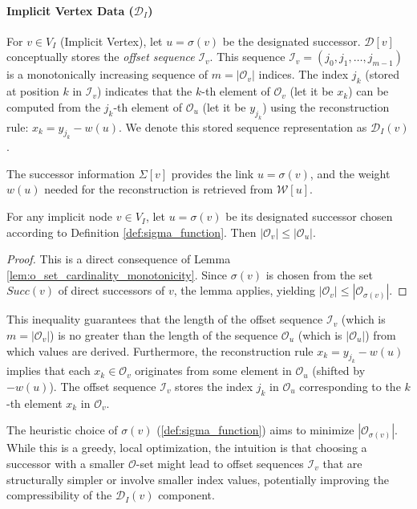 \paragraph{Implicit Vertex Data ($\mathcal{D}_I$)}
For $v \in V_I$ (Implicit Vertex), let $u = \sigma(v)$ be the designated successor. $\mathcal{D}[v]$ conceptually stores the \emph{offset sequence} $\mathcal{I}_v$. This sequence $\mathcal{I}_v = (j_0, j_1, \dots, j_{m-1})$ is a monotonically increasing sequence of $m = |\mathcal{O}_v|$ indices. The index $j_k$ (stored at position $k$ in $\mathcal{I}_v$) indicates that the $k$-th element of $\mathcal{O}_v$ (let it be $x_k$) can be computed from the $j_k$-th element of $\mathcal{O}_u$ (let it be $y_{j_k}$) using the reconstruction rule: $x_k = y_{j_k} - w(u)$. We denote this stored sequence representation as $\mathcal{D}_I(v)$.

The successor information $\Sigma[v]$ provides the link $u = \sigma(v)$, and the weight $w(u)$ needed for the reconstruction is retrieved from $\mathcal{W}[u]$.

\begin{proposition}
    \label{prop:o_set_size_guarantee}
    For any implicit node $v \in V_I$, let $u = \sigma(v)$ be its designated successor chosen according to Definition \ref{def:sigma_function}. Then $|\mathcal{O}_v| \le |\mathcal{O}_u|$.
\end{proposition}
\begin{proof}
    This is a direct consequence of Lemma \ref{lem:o_set_cardinality_monotonicity}. Since $\sigma(v)$ is chosen from the set $Succ(v)$ of direct successors of $v$, the lemma applies, yielding $|\mathcal{O}_v| \le |\mathcal{O}_{\sigma(v)}|$.
\end{proof}
This inequality guarantees that the length of the offset sequence $\mathcal{I}_v$ (which is $m = |\mathcal{O}_v|$) is no greater than the length of the sequence $\mathcal{O}_u$ (which is $|\mathcal{O}_u|$) from which values are derived. Furthermore, the reconstruction rule $x_k = y_{j_k} - w(u)$ implies that each $x_k \in \mathcal{O}_v$ originates from some element in $\mathcal{O}_u$ (shifted by $-w(u)$). The offset sequence $\mathcal{I}_v$ stores the index $j_k$ in $\mathcal{O}_u$ corresponding to the $k$-th element $x_k$ in $\mathcal{O}_v$.

The heuristic choice of $\sigma(v)$ (\ref{def:sigma_function}) aims to minimize $|\mathcal{O}_{\sigma(v)}|$. While this is a greedy, local optimization, the intuition is that choosing a successor with a smaller $\mathcal{O}$-set might lead to offset sequences $\mathcal{I}_v$ that are structurally simpler or involve smaller index values, potentially improving the compressibility of the $\mathcal{D}_I(v)$ component.

